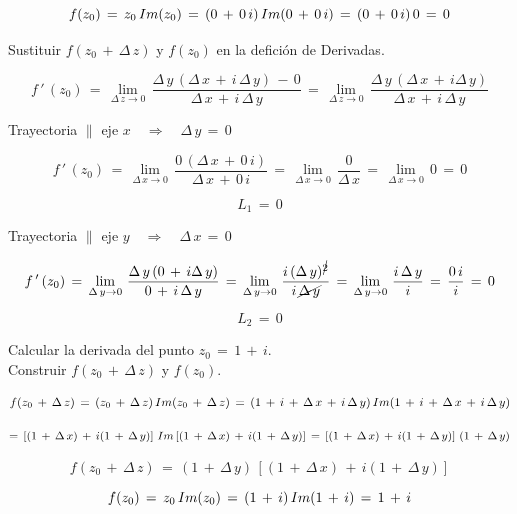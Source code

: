\documentclass[a4paper,11pt,openany]{book}
\begin{document}
$$f(z_{0})\,=\,z_{0}\,\mathnormal{Im}(z_{0})\,=\,(0\,+\,0\,i)\,\mathnormal{Im}(0\,+\,0\,i)\,=\,(0\,+\,0\,i)\,0\,=\,0$$

\textcolor{ao(english)}{} Sustituir  $f(z_{0}\,+\,\Delta\,z)$ y $f(z_{0})$ en la defición de Derivadas.

$$f\,'\,(z_{0})\,=\,\displaystyle\lim_{\Delta\,z \to 0}\,\dfrac{\Delta\,y\,(\Delta\,x\,+\,i\,\Delta\,y)\,-\,0}{\Delta\,x\,+\,i\,\Delta\,y}\,=\,\displaystyle\lim_{\Delta\,z \to 0}\,\dfrac{\Delta\,y\,(\Delta\,x\,+\,i\Delta\,y)}{\Delta\,x\,+\,i\,\Delta\,y}$$

\textcolor{ao(english)}{} Trayectoria $\parallel$ eje $x \quad\Rightarrow\quad \Delta\,y\,=\,0$

$$f\,'\,(z_{0})\,=\,\displaystyle\lim_{\Delta\,x \to 0}\,\dfrac{0\,(\Delta\,x\,+\,0\,i)}{\Delta\,x\,+\,0\,i}\,=\,\displaystyle\lim_{\Delta\,x \to 0}\,\dfrac{0}{\Delta\,x}\,=\,\displaystyle\lim_{\Delta\,x \to 0}\,0\,=\,0$$

$$L_{1}\,=\,0$$

\textcolor{ao(english)}{} Trayectoria $\parallel$ eje $y \quad\Rightarrow\quad \Delta\,x\,=\,0$

$$f\,'\,(z_{0})\,=\,\displaystyle\lim_{\Delta\,y \to 0}\,\dfrac{\Delta\,y\,(0\,+\,i\Delta\,y)}{0\,+\,i\,\Delta\,y}\,=\,\displaystyle\lim_{\Delta\,y \to 0}\,\dfrac{i\,(\Delta\,y)^{\cancel{2}}}{i\,\cancel{\Delta\,y}}\,=\,\displaystyle\lim_{\Delta\,y \to 0}\,\dfrac{i\,\Delta\,y}{i}\,=\,\dfrac{0\,i}{i}\,=\,0$$

$$L_{2}\,=\,0$$

\textcolor{ao(english)}{} Calcular la derivada del punto $z_{0}\,=\,1\,+\,i$.\\

\textcolor{ao(english)}{} Construir $f(z_{0}\,+\,\Delta\,z)$ y $f(z_{0})$.

$$f(z_{0}\,+\,\Delta\,z)\,=\,(z_{0}\,+\,\Delta\,z)\,\mathnormal{Im}(z_{0}\,+\,\Delta\,z)\,=\,(1\,+\,i\,+\,\Delta\,x\,+\,i\,\Delta\,y)\,\mathnormal{Im}(1\,+\,i\,+\,\Delta\,x\,+\,i\,\Delta\,y)$$

$$=\,\left[(1\,+\,\Delta\,x)\,+\,i(1\,+\,\Delta\,y)\right]\,\mathnormal{Im}\left[(1\,+\,\Delta\,x)\,+\,i(1\,+\,\Delta\,y)\right]\,=\,\left[(1\,+\,\Delta\,x)\,+\,i(1\,+\,\Delta\,y)\right]\,(1\,+\,\Delta\,y)$$

$$f(z_{0}\,+\,\Delta\,z)\,=\,(1\,+\,\Delta\,y)\,\left[(1\,+\,\Delta\,x)\,+\,i(1\,+\,\Delta\,y)\right]$$

$$f(z_{0})\,=\,z_{0}\,\mathnormal{Im}(z_{0})\,=\,(1\,+\,i)\,\mathnormal{Im}(1\,+\,i)\,=\,1\,+\,i$$
\end{document}

